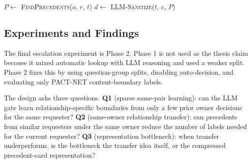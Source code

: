 \begin{algorithm}[t]
\caption{Pre-tool Escalation Gate}\label{alg:escalation_gate}
\DontPrintSemicolon
{}
\BlankLine
$P \leftarrow$ \textsc{FindPrecedents}($o$, $r$, $t$) 
$d \leftarrow$ \textsc{LLM-Sanitize}($t$, $c$, $P$) 
\BlankLine
{}
\BlankLine
{}
\end{algorithm}

\subsection{Experiments and Findings}
\label{sec:escalation_validation}

The final escalation experiment is Phase 2. Phase 1 is not used as the thesis claim because it mixed automatic lookup with LLM reasoning and used a weaker split. Phase 2 fixes this by using question-group splits, disabling auto-decision, and evaluating only PACT-NET content-boundary labels.

The design asks three questions. \textbf{Q1} (sparse same-pair learning): can the LLM gate learn relationship-specific boundaries from only a few prior owner decisions for the same requester? \textbf{Q2} (same-owner relationship transfer): can precedents from similar requesters under the same owner reduce the number of labels needed for the current requester? \textbf{Q3} (representation bottleneck): when transfer underperforms, is the bottleneck the transfer idea itself, or the compressed precedent-card representation?

